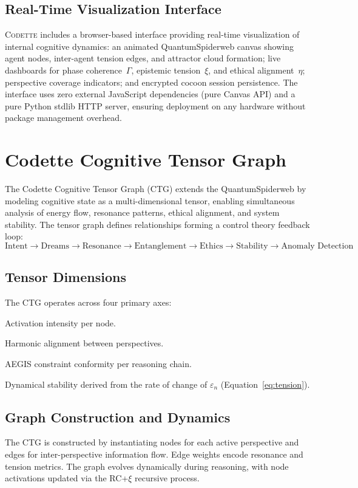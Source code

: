\documentclass[11pt,a4paper]{article}
\newcommand{\rcxi}{RC+$\xi$}
\newcommand{\codette}{\textsc{Codette}}
\begin{document}
\subsection{Real-Time Visualization Interface}
\codette{} includes a browser-based interface providing real-time visualization of internal cognitive dynamics: an animated QuantumSpiderweb canvas showing agent nodes, inter-agent tension edges, and attractor cloud formation; live dashboards for phase coherence~$\Gamma$, epistemic tension~$\xi$, and ethical alignment~$\eta$; perspective coverage indicators; and encrypted cocoon session persistence. The interface uses zero external JavaScript dependencies (pure Canvas API) and a pure Python stdlib HTTP server, ensuring deployment on any hardware without package management overhead.

\section{Codette Cognitive Tensor Graph}
\label{sec:ctg}

The Codette Cognitive Tensor Graph (CTG) extends the QuantumSpiderweb by modeling cognitive state as a multi-dimensional tensor, enabling simultaneous analysis of energy flow, resonance patterns, ethical alignment, and system stability. The tensor graph defines relationships forming a control theory feedback loop:
\[
  \text{Intent} \to \text{Dreams} \to \text{Resonance} \to \text{Entanglement} \to \text{Ethics} \to \text{Stability} \to \text{Anomaly Detection}
\]

\subsection{Tensor Dimensions}
The CTG operates across four primary axes:
\begin{description}[leftmargin=*]
  \item[Cognitive Energy ($E$)] Activation intensity per node.
  \item[Resonance ($R$)] Harmonic alignment between perspectives.
  \item[Ethical Alignment ($\eta$)] AEGIS constraint conformity per reasoning chain.
  \item[Stability ($S$)] Dynamical stability derived from the rate of change of $\varepsilon_n$ (Equation~\ref{eq:tension}).
\end{description}

\subsection{Graph Construction and Dynamics}
The CTG is constructed by instantiating nodes for each active perspective and edges for inter-perspective information flow. Edge weights encode resonance and tension metrics. The graph evolves dynamically during reasoning, with node activations updated via the \rcxi{} recursive process.
\end{document}

